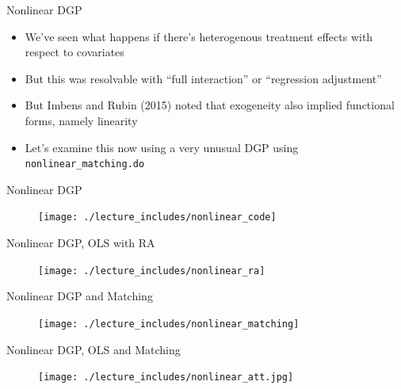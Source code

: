\documentclass{beamer}
\begin{document}
\begin{frame}{Nonlinear DGP}

\begin{itemize}

\item We've seen what happens if there's heterogenous treatment effects with respect to covariates
\item But this was resolvable with ``full interaction'' or ``regression adjustment''
\item But Imbens and Rubin (2015) noted that exogeneity also implied functional forms, namely linearity
\item Let's examine this now using a very unusual DGP using \texttt{nonlinear\_matching.do}

\end{itemize}

\end{frame}




\begin{frame}{Nonlinear DGP}

\begin{figure}[!t]\centering
\texttt{[image: ./lecture\_includes/nonlinear\_code]}
\end{figure}

\end{frame}

\begin{frame}{Nonlinear DGP, OLS with RA}

\begin{figure}[!t]\centering
\texttt{[image: ./lecture\_includes/nonlinear\_ra]}
\end{figure}

\end{frame}


\begin{frame}{Nonlinear DGP and Matching}

\begin{figure}[!t]\centering
\texttt{[image: ./lecture\_includes/nonlinear\_matching]}
\end{figure}

\end{frame}

\begin{frame}{Nonlinear DGP, OLS and Matching}

\begin{figure}[!t]\centering
\texttt{[image: ./lecture\_includes/nonlinear\_att.jpg]}
\end{figure}

\end{frame}
\end{document}
